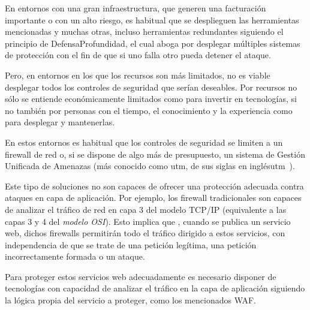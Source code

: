\par En entornos con una gran infraestructura, que generen una facturación importante o con un alto riesgo, es habitual que se desplieguen las herramientas
mencionadas y muchas otras, incluso herramientas redundantes siguiendo el principio de \gls{DefensaProfundidad},  el cual aboga por desplegar múltiples sistemas
de protección con el fin de que si uno falla otro pueda detener el ataque.
\par Pero, en entornos en los que los recursos son más limitados, no es viable desplegar todos los controles de seguridad que serían deseables. Por recursos no
sólo se entiende económicamente limitados como para invertir en tecnologías, si no también por personas con el tiempo, el conocimiento y la experiencia como
para desplegar y mantenerlas.
\par En estos entornos es habitual que los controles de seguridad se limiten a un firewall de red o, si se dispone de algo más de presupuesto, un sistema de
Gestión Unificada de Amenazas (más conocido como \acrshort{utm}, de sus siglas en inglés\acrlong{utm}~\cite{wiki:utm}).
\par Este tipo de soluciones no son capaces de ofrecer una protección adecuada contra ataques en capa de aplicación. Por ejemplo, los firewall tradicionales son
capaces de analizar el tráfico de red en capa 3 del modelo TCP/IP\cite{wiki:tcpip} (equivalente a las capas 3 y 4 del {\em modelo OSI\cite{osi}}). Esto implica que , cuando se
publica un servicio web, dichos firewalls permitirán todo el tráfico dirigido a estos servicios, con independencia de que se trate de una petición legítima, una
petición incorrectamente formada o un ataque.
\par Para proteger estos servicios web adecuadamente es necesario disponer de tecnologías con capacidad de analizar el tráfico en la capa de aplicación
siguiendo la lógica propia del servicio a proteger, como los mencionados WAF.

